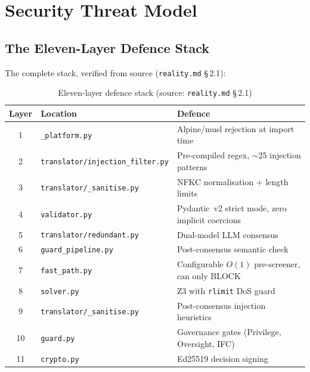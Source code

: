 \documentclass[12pt,a4paper,oneside]{report}
\newcommand{\fname}[1]{\texttt{#1}}          %
\newcommand{\code}[1]{\texttt{#1}}           %
\newcommand{\cfrsec}[1]{\S\,#1}             %
\begin{document}
\chapter{Security Threat Model}

\section{The Eleven-Layer Defence Stack}

The complete stack, verified from source (\fname{reality.md} \cfrsec{2.1}):

\begin{table}[h]
\centering\small
\begin{tabular}{@{} c l p{7.5cm} @{}}
\toprule
\textbf{Layer} & \textbf{Location} & \textbf{Defence} \\
\midrule
1  & \fname{\_platform.py}                   & Alpine/musl rejection at import time \\
2  & \fname{translator/injection\_filter.py} & Pre-compiled regex, $\sim$25 injection patterns \\
3  & \fname{translator/\_sanitise.py}         & NFKC normalisation $+$ length limits \\
4  & \fname{validator.py}                    & Pydantic~v2 strict mode, zero implicit coercions \\
5  & \fname{translator/redundant.py}         & Dual-model LLM consensus \\
6  & \fname{guard\_pipeline.py}              & Post-consensus semantic check \\
7  & \fname{fast\_path.py}                   & Configurable $O(1)$ pre-screener, can only BLOCK \\
8  & \fname{solver.py}                       & Z3 with \code{rlimit} DoS guard \\
9  & \fname{translator/\_sanitise.py}         & Post-consensus injection heuristics \\
10 & \fname{guard.py}                        & Governance gates (Privilege, Oversight, IFC) \\
11 & \fname{crypto.py}                       & Ed25519 decision signing \\
\bottomrule
\end{tabular}
\caption{Eleven-layer defence stack (source: \fname{reality.md} \cfrsec{2.1})}
\end{table}
\end{document}
